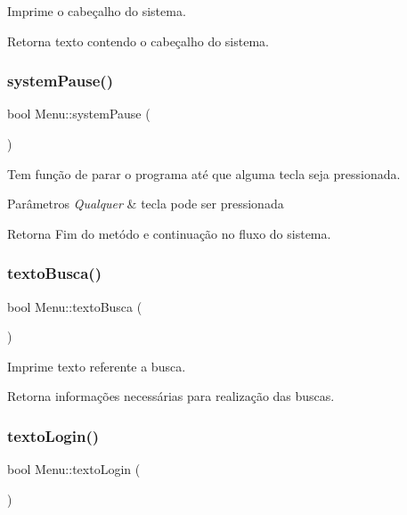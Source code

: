 Imprime o cabeçalho do sistema. \begin{DoxyReturn}{Retorna}
texto contendo o cabeçalho do sistema. 
\end{DoxyReturn}
\mbox{\label{class_menu_a21f77dfb517833a3f0e69043900c7b2e}} 
\subsubsection{\texorpdfstring{systemPause()}{systemPause()}}
{\footnotesize\ttfamily bool Menu\+::system\+Pause (\begin{DoxyParamCaption}{ }\end{DoxyParamCaption})}

Tem função de parar o programa até que alguma tecla seja pressionada. 
\begin{DoxyParams}{Parâmetros}
{\em Qualquer} & tecla pode ser pressionada \\
\hline
\end{DoxyParams}
\begin{DoxyReturn}{Retorna}
Fim do metódo e continuação no fluxo do sistema. 
\end{DoxyReturn}
\mbox{\label{class_menu_a06f1be568f96653c23109fd1211c9388}} 
\subsubsection{\texorpdfstring{textoBusca()}{textoBusca()}}
{\footnotesize\ttfamily bool Menu\+::texto\+Busca (\begin{DoxyParamCaption}{ }\end{DoxyParamCaption})}

Imprime texto referente a busca. \begin{DoxyReturn}{Retorna}
informações necessárias para realização das buscas. 
\end{DoxyReturn}
\mbox{\label{class_menu_ab8fe95eae2d7d6942b27b3e64e6b3ad3}} 
\subsubsection{\texorpdfstring{textoLogin()}{textoLogin()}}
{\footnotesize\ttfamily bool Menu\+::texto\+Login (\begin{DoxyParamCaption}{ }\end{DoxyParamCaption})}

